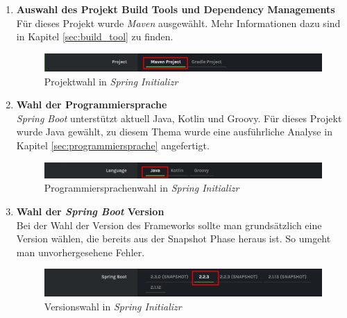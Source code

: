 \begin{enumerate}

\item \textbf{Auswahl des Projekt Build Tools und Dependency Managements}\\
Für dieses Projekt wurde \textit{Maven} ausgewählt. Mehr Informationen dazu sind in Kapitel \ref{sec:build_tool} zu finden.
\begin{figure}[H]
\centering
\includegraphics[width=\pictureWidth cm]{Bilder/Kapitel_4/init_project.png}
\caption{Projektwahl in \textit{Spring Initializr}\label{fig:init_project}}
\end{figure}

\item \textbf{Wahl der Programmiersprache}\\
\textit{Spring Boot} unterstützt aktuell Java, Kotlin und Groovy. Für dieses Projekt wurde Java gewählt, zu diesem Thema wurde eine ausführliche Analyse in Kapitel \ref{sec:programmiersprache} angefertigt.
\begin{figure}[H]
\centering
\includegraphics[width=\pictureWidth cm]{Bilder/Kapitel_4/init_sprache.png}
\caption{Programmiersprachenwahl in \textit{Spring Initializr}\label{fig:init_sprache}}
\end{figure}

\item \textbf{Wahl der \textit{Spring Boot} Version}\\
Bei der Wahl der Version des Frameworks sollte man grundsätzlich eine Version wählen, die bereits aus der Snapshot Phase heraus ist. So umgeht man unvorhergesehene Fehler.
\begin{figure}[H]
\centering
\includegraphics[width=\pictureWidth cm]{Bilder/Kapitel_4/init_version.png}
\caption{Versionswahl in \textit{Spring Initializr}\label{fig:init_version}}
\end{figure}


\end{enumerate}
